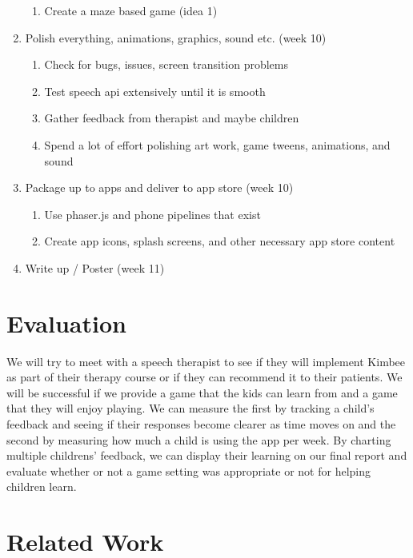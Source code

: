 \documentclass{article}
\begin{document}
\begin{enumerate}
    \begin{enumerate}
        \item Create a maze based game (idea 1)
    \end{enumerate}
    \item Polish everything, animations, graphics, sound etc. (week 10)
    \begin{enumerate}
        \item Check for bugs, issues, screen transition problems
        \item Test speech api extensively until it is smooth
        \item Gather feedback from therapist and maybe children
        \item Spend a lot of effort polishing art work, game tweens, animations, and sound
    \end{enumerate}
    \item Package up to apps and deliver to app store (week 10)
    \begin{enumerate}
        \item Use phaser.js and phone pipelines that exist
        \item Create app icons, splash screens, and other necessary app store content
    \end{enumerate}
    \item Write up / Poster (week 11)
\end{enumerate}

\section{Evaluation}

We will try to meet with a speech therapist to see if they will implement Kimbee as part of their therapy course or if they can recommend it to their patients. We will be successful if we provide a game that the kids can learn from and a game that they will enjoy playing. We can measure the first by tracking a child's feedback and seeing if their responses become clearer as time moves on and the second by measuring how much a child is using the app per week. By charting multiple childrens' feedback, we can display their learning on our final report and evaluate whether or not a game setting was appropriate or not for helping children learn.

\section{Related Work}
\end{document}
